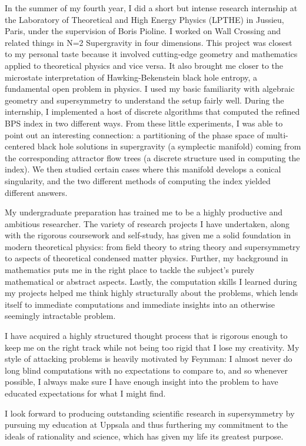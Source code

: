 \documentclass[11pt, a4paper]{awesome-cv}
\begin{document}
\begin{cvletter}
  In the summer of my fourth year, I did a short but intense research internship at the Laboratory of Theoretical and High Energy Physics (LPTHE) in Jussieu, Paris, under the supervision of Boris Pioline. I worked on Wall Crossing and related things in N=2 Supergravity in four dimensions. This project was closest to my personal taste because it involved cutting-edge geometry and mathematics applied to theoretical physics and vice versa. It also brought me closer to the microstate interpretation of Hawking-Bekenstein black hole entropy, a fundamental open problem in physics. I used my basic familiarity with algebraic geometry and supersymmetry to understand the setup fairly well. During the internship, I implemented a host of discrete algorithms that computed the refined BPS index in two different ways. From these little experiments, I was able to point out an interesting connection: a partitioning of the phase space of multi-centered black hole solutions in supergravity (a symplectic manifold) coming from the corresponding attractor flow trees (a discrete structure used in computing the index). We then studied certain cases where this manifold develops a conical singularity, and the two different methods of computing the index yielded different answers.
  
  My undergraduate preparation has trained me to be a highly productive and ambitious researcher. The variety of research projects I have undertaken, along with the rigorous coursework and self-study, has given me a solid foundation in modern theoretical physics: from field theory to string theory and supersymmetry to aspects of theoretical condensed matter physics. Further, my background in mathematics puts me in the right place to tackle the subject's purely mathematical or abstract aspects. Lastly, the computation skills I learned during my projects helped me think highly structurally about the problems, which lends itself to immediate computations and immediate insights into an otherwise seemingly intractable problem.
  
  I have acquired a highly structured thought process that is rigorous enough to keep me on the right track while not being too rigid that I lose my creativity. My style of attacking problems is heavily motivated by Feynman: I almost never do long blind computations with no expectations to compare to, and so whenever possible, I always make sure I have enough insight into the problem to have educated expectations for what I might find.
  
  I  look forward to producing outstanding scientific research in supersymmetry by pursuing my education at Uppsala and thus furthering my commitment to the ideals of rationality and science, which has given my life its greatest purpose.
  
  

\end{cvletter}


\makeletterclosing
\end{document}
